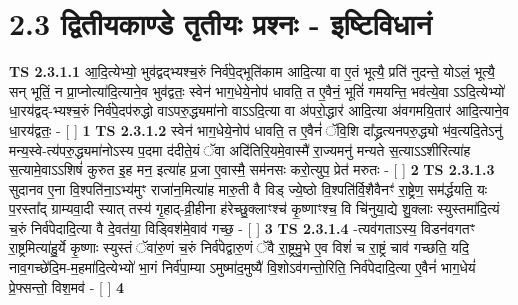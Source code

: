 \documentclass[17pt]{extarticle}
\begin{document}
     \section*{ 2.3     द्वितीयकाण्डे तृतीयः प्रश्नः - इष्टिविधानं }
                                        \textbf{ TS 2.3.1.1} \newline
                  आ॒दि॒त्येभ्यो॒ भुव॑द्वद्भ्यश्च॒रुं निर्व॑पे॒द्भूति॑काम आदि॒त्या वा ए॒तं भूत्यै॒ प्रति॑ नुदन्ते॒ योऽलं॒ भूत्यै॒ सन् भूतिं॒ न प्रा॒प्नोत्या॑दि॒त्याने॒व भुव॑द्वतः॒ स्वेन॑ भाग॒धेये॒नोप॑ धावति॒ त ए॒वैनं॒ भूतिं॑ गमयन्ति॒ भव॑त्ये॒वा ऽऽदि॒त्येभ्यो॑ धा॒रय॑द्वद्-भ्यश्च॒रुं निर्व॑पे॒दप॑रुद्धो वाऽपरु॒द्ध्यमा॑नो वाऽऽदि॒त्या वा अ॑परो॒द्धार॑ आदि॒त्या अ॑वगमयि॒तार॑ आदि॒त्याने॒व धा॒रय॑द्वतः॒ - [  ] \textbf{  1} \newline
                  \newline
                                \textbf{ TS 2.3.1.2} \newline
                  स्वेन॑ भाग॒धेये॒नोप॑ धावति॒ त ए॒वैनं॑ ॅवि॒शि दा᳚द्ध्रत्यनपरु॒द्ध्यो भ॑व॒त्यदि॒तेऽनु॑ मन्य॒स्वे-त्य॑परु॒द्ध्यमा॑नोऽस्य प॒दमा द॑दीते॒यं ॅवा अदि॑तिरि॒यमे॒वास्मै॑ रा॒ज्यमनु॑ मन्यते स॒त्याऽऽशीरित्या॑ह स॒त्यामे॒वाऽऽशिषं॑ कुरुत इ॒ह मन॒ इत्या॑ह प्र॒जा ए॒वास्मै॒ सम॑नसः करो॒त्युप॒ प्रेत॑ मरुतः - [  ] \textbf{  2} \newline
                  \newline
                                \textbf{ TS 2.3.1.3} \newline
                  सुदानव ए॒ना वि॒श्पति॑ना॒ऽभ्य॑मुꣳ राजा॑न॒मित्या॑ह मारु॒ती वै विड् ज्ये॒ष्ठो वि॒श्पति॑र्वि॒शैवैनꣳ॑ रा॒ष्ट्रेण॒ सम॑र्द्धयति॒ यः प॒रस्ता᳚द् ग्राम्यवा॒दी स्यात् तस्य॑ गृ॒हाद्-व्री॒हीना ह॑रेच्छु॒क्लाꣳश्च॑ कृ॒ष्णाꣳश्च॒ वि चि॑नुया॒द्ये शु॒क्लाः स्युस्तमा॑दि॒त्यं च॒रुं निर्व॑पेदादि॒त्या वै दे॒वत॑या॒ विड्विश॑मे॒वाव॑ गच्छ॒ - [  ] \textbf{  3} \newline
                  \newline
                                \textbf{ TS 2.3.1.4} \newline
                  -त्यव॑गताऽस्य॒ विडन॑वगतꣳ रा॒ष्ट्रमित्या॑हु॒र्ये कृ॒ष्णाः स्युस्तं ॅवा॑रु॒णं च॒रुं निर्व॑पेद्वारु॒णं ॅवै रा॒ष्ट्रमु॒भे ए॒व विशं॑ च रा॒ष्ट्रं चाव॑ गच्छति॒ यदि॒ नाव॒गच्छे॑दि॒म-म॒हमा॑दि॒त्येभ्यो॑ भा॒गं निर्व॑पा॒म्या ऽमुष्मा॑द॒मुष्यै॑ वि॒शोऽव॑गन्तो॒रिति॒ निर्व॑पेदादि॒त्या ए॒वैनं॑ भाग॒धेयं॑ प्रे॒फ्सन्तो॒ विश॒मव॑ - [  ] \textbf{  4} \newline
\end{document}
